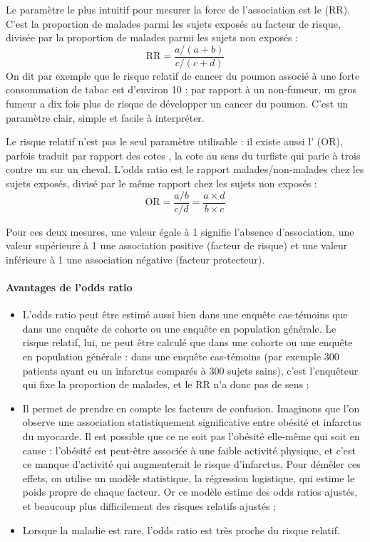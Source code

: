 Le paramètre le plus intuitif pour mesurer la force de l'association est le  (RR). C'est la proportion de malades parmi les sujets exposés au facteur de risque, divisée par la proportion de malades parmi les sujets non exposés :
\[
\text{RR}=\frac{a/(a+b)}{c/(c+d)}
\]
On dit par exemple que le risque relatif de cancer du poumon associé à une forte consommation de tabac est d'environ 10 : par rapport à un non-fumeur, un gros fumeur a dix fois plus de risque de développer un cancer du poumon. C'est un paramètre clair, simple et facile à interpréter.

Le risque relatif n'est pas le seul paramètre utilisable : il existe aussi l' (OR), parfois traduit par \og rapport des cotes \fg{}, la cote au sens du turfiste qui parie à trois contre un sur un cheval. L'odds ratio est le rapport malades/non-malades chez les sujets exposés, divisé par le même rapport chez les sujets non exposés :
\[
\text{OR}=\frac{a/b}{c/d}=\frac{a \times d}{b \times c}
\]

Pour ces deux mesures, une valeur égale à 1 signifie l'absence d'association, une valeur supérieure à 1 une association positive (facteur de risque) et une valeur inférieure à 1 une association négative (facteur protecteur).

\paragraph{Avantages de l'odds ratio}
\begin{itemize}
	\item L'odds ratio peut être estimé aussi bien dans une enquête cas-témoins que dans une enquête de cohorte ou une enquête en population générale. Le risque relatif, lui, ne peut être calculé que dans une cohorte ou une enquête en population générale : dans une enquête cas-témoins (par exemple 300 patients ayant eu un infarctus comparés à 300 sujets sains), c'est l'enquêteur qui fixe la proportion de malades, et le RR n'a donc pas de sens ;
	\item Il permet de prendre en compte les facteurs de confusion. Imaginons que l'on observe une association statistiquement significative entre obésité et infarctus du myocarde. Il est possible que ce ne soit pas l'obésité elle-même qui soit en cause : l'obésité est peut-être associée à une faible activité physique, et c'est ce manque d'activité qui augmenterait le risque d'infarctus. Pour démêler ces effets, on utilise un modèle statistique, la régression logistique, qui estime le poids propre de chaque facteur. Or ce modèle estime des odds ratios ajustés, et beaucoup plus difficilement des risques relatifs ajustés ;
	\item Lorsque la maladie est rare, l'odds ratio est très proche du risque relatif.
\end{itemize}

